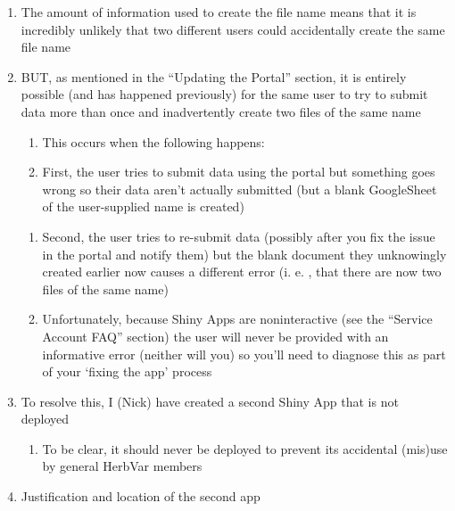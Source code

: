 \documentclass[
  letterpaper,
  oneside,
  open=any]{scrbook}
\providecommand{\tightlist}{%
  \setlength{\itemsep}{0pt}\setlength{\parskip}{0pt}}\usepackage{longtable,booktabs,array}
\begin{document}
\begin{enumerate}
\def\labelenumi{\arabic{enumi}.}
\item
  The amount of information used to create the file name means that it
  is incredibly unlikely that two different users could accidentally
  create the same file name
\item
  BUT, as mentioned in the ``Updating the Portal'' section, it is
  entirely possible (and has happened previously) for the same user to
  try to submit data more than once and inadvertently create two files
  of the same name

  \begin{enumerate}
  \def\labelenumii{\alph{enumii}.}
  \item
    This occurs when the following happens:
  \item
    First, the user tries to submit data using the portal but something
    goes wrong so their data aren't actually submitted (but a blank
    GoogleSheet of the user-supplied name is created)
  \end{enumerate}

  \begin{enumerate}
  \def\labelenumii{\roman{enumii}.}
  \setcounter{enumii}{1}
  \item
    Second, the user tries to re-submit data (possibly after you fix the
    issue in the portal and notify them) but the blank document they
    unknowingly created earlier now causes a different error (i. e. ,
    that there are now two files of the same name)
  \item
    Unfortunately, because Shiny Apps are noninteractive (see the
    ``Service Account FAQ'' section) the user will never be provided
    with an informative error (neither will you) so you'll need to
    diagnose this as part of your `fixing the app' process
  \end{enumerate}
\item
  To resolve this, I (Nick) have created a second Shiny App that is not
  deployed

  \begin{enumerate}
  \def\labelenumii{\alph{enumii}.}
  \tightlist
  \item
    To be clear, it should never be deployed to prevent its accidental
    (mis)use by general HerbVar members
  \end{enumerate}
\item
  Justification and location of the second app


\end{enumerate}
\end{document}
